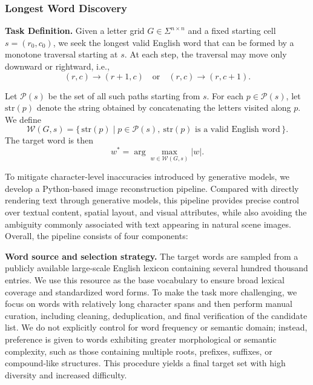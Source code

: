 \subsubsection{Longest Word Discovery}
\label{supp:Longest Word Discovery}

\textbf{Task Definition.} Given a letter grid \( G \in \Sigma^{n \times n} \) and a fixed starting cell
\( s = (r_0, c_0) \), we seek the longest valid English word that can be formed
by a monotone traversal starting at \( s \). At each step, the traversal may
move only downward or rightward, i.e.,
\[
(r,c) \rightarrow (r+1,c)
\quad \text{or} \quad
(r,c) \rightarrow (r,c+1).
\]

Let \( \mathcal{P}(s) \) be the set of all such paths starting from \( s \).
For each \( p \in \mathcal{P}(s) \), let \( \mathrm{str}(p) \) denote the string
obtained by concatenating the letters visited along \( p \). We define
\[
\mathcal{W}(G,s) = \{\, \mathrm{str}(p) \mid p \in \mathcal{P}(s),\ \mathrm{str}(p)
\text{ is a valid English word} \,\}.
\]
The target word is then
\begin{equation}
w^* = \arg\max_{w \in \mathcal{W}(G,s)} |w|.
\end{equation}

To mitigate character-level inaccuracies introduced by generative models, we
develop a Python-based image reconstruction pipeline. Compared with directly
rendering text through generative models, this pipeline provides precise
control over textual content, spatial layout, and visual attributes, while
also avoiding the ambiguity commonly associated with text appearing in natural
scene images. Overall, the pipeline consists of four components:

\textbf{Word source and selection strategy.}
The target words are sampled from a publicly available large-scale English lexicon containing several hundred thousand entries. 
We use this resource as the base vocabulary to ensure broad lexical coverage and standardized word forms. To make the task more challenging, we focus on words with relatively long character spans and then perform manual curation,
including cleaning, deduplication, and final verification of the candidate
list. We do not explicitly control for word frequency or semantic domain;
instead, preference is given to words exhibiting greater morphological or
semantic complexity, such as those containing multiple roots, prefixes,
suffixes, or compound-like structures. This procedure yields a final target
set with high diversity and increased difficulty.

